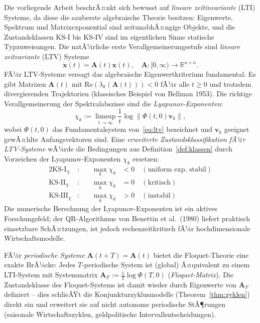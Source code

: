 ﻿\documentclass[12pt, a4paper, titlepage]{report}
\theoremstyle{definition}
\theoremstyle{remark}
\newcommand{\R}{\mathbb{R}}
\newcommand{\vx}{\bm{x}}
\newcommand{\vA}{\bm{A}}
\newcommand{\re}{\mathrm{Re}}
\newcommand{\KS}{\mathrm{KS}}
\begin{document}
Die vorliegende Arbeit beschrÃ¤nkt sich bewusst auf \emph{lineare zeitinvariante} (LTI)
Systeme, da diese die sauberste algebraische Theorie besitzen: Eigenwerte, Spektrum und
Matrixexponential sind zeitunabhÃ¤ngige Objekte, und die Zustandsklassen KS-I bis KS-IV
sind im eigentlichen Sinne statische Typzuweisungen. Die natÃ¼rliche erste
Verallgemeinerungsstufe sind \emph{lineare zeitvariante} (LTV) Systeme
\begin{equation}
  \dot{\vx}(t) = \vA(t)\vx(t), \quad \vA : [0,\infty) \to \R^{n \times n}.
  \label{eq:ltv}
\end{equation}
FÃ¼r LTV-Systeme versagt das algebraische Eigenwertkriterium fundamental: Es gibt
Matrizen $\vA(t)$ mit $\re(\lambda_k(\vA(t))) < 0$ fÃ¼r alle $t \geq 0$ und trotzdem
divergierenden Trajektorien (klassisches Beispiel von Bellman 1953). Die richtige
Verallgemeinerung der Spektralabszisse sind die \emph{Lyapunov-Exponenten}:
\begin{equation}
  \chi_k := \limsup_{t \to \infty} \frac{1}{t} \log \| \Phi(t,0)\bm{v}_k \|,
  \label{eq:lyapunov_exp}
\end{equation}
wobei $\Phi(t,0)$ das Fundamentalsystem von~\eqref{eq:ltv} bezeichnet und $\bm{v}_k$
geeignet gewÃ¤hlte Anfangsvektoren sind. Eine \emph{erweiterte Zustandsklassifikation
fÃ¼r LTV-Systeme} wÃ¼rde die Bedingungen aus Definition~\ref{def:klassen} durch
Vorzeichen der Lyapunov-Exponenten $\chi_k$ ersetzen:
\begin{alignat}{2}
  \KS\text{-I}_\chi  &:\quad &\max_k \chi_k &< 0 \quad (\text{uniform exp. stabil})\\
  \KS\text{-II}_\chi &:\quad &\max_k \chi_k &= 0 \quad (\text{kritisch})\\
  \KS\text{-III}_\chi&:\quad &\max_k \chi_k &> 0 \quad (\text{instabil})
\end{alignat}
Die numerische Berechnung der Lyapunov-Exponenten ist ein aktives Forschungsfeld;
der QR-Algorithmus von Benettin et al.~(1980) liefert praktisch einsetzbare SchÃ¤tzungen,
ist jedoch rechenzeitkritisch fÃ¼r hochdimensionale Wirtschaftsmodelle.

FÃ¼r \emph{periodische Systeme} $\vA(t+T) = \vA(t)$ bietet die Floquet-Theorie
eine exakte BrÃ¼cke: Jedes $T$-periodische System ist (global) Ã¤quivalent zu einem
LTI-System mit Systemmatrix $\vA_F := \frac{1}{T}\log \Phi(T,0)$ (\emph{Floquet-Matrix}).
Die Zustandsklasse des Floquet-Systems ist damit wieder durch Eigenwerte von $\vA_F$
definiert -- dies schlieÃŸt die Konjunkturzyklusmodelle (Theorem~\ref{thm:zyklen}) direkt
ein und erweitert sie auf nicht autonome periodische StÃ¶rungen (saisonale Wirtschaftszyklen,
geldpolitische Intervall\-entscheidungen).
\end{document}
